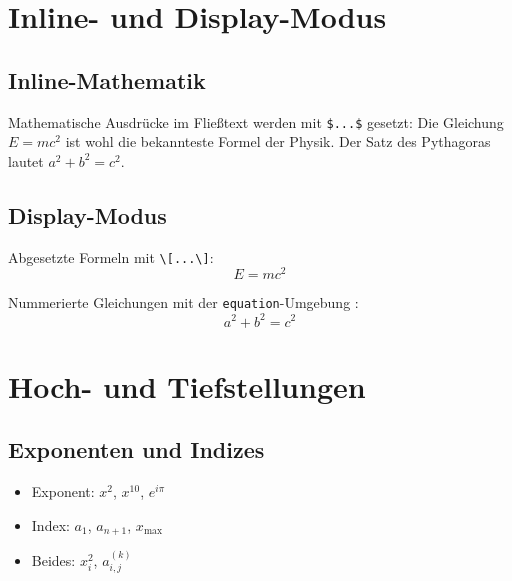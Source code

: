
\chapter{Inline- und Display-Modus}
\label{sec:modi}

\section{Inline-Mathematik}

Mathematische Ausdrücke im Fließtext werden mit \texttt{\$...\$} gesetzt:
Die Gleichung $E = mc^2$ ist wohl die bekannteste Formel der Physik.
Der Satz des Pythagoras lautet $a^2 + b^2 = c^2$.

\section{Display-Modus}

Abgesetzte Formeln mit \texttt{\textbackslash[...\textbackslash]}:
\[
    E = mc^2
\]

Nummerierte Gleichungen mit der \texttt{equation}-Umgebung \cite{mittelbach2004}:
\begin{equation}
    a^2 + b^2 = c^2
    \label{eq:pythagoras}
\end{equation}

\chapter{Hoch- und Tiefstellungen}
\label{sec:stellen}

\section{Exponenten und Indizes}

\begin{itemize}
    \item Exponent: $x^2$, $x^{10}$, $e^{i\pi}$
    \item Index: $a_1$, $a_{n+1}$, $x_{\max}$
    \item Beides: $x_i^2$, $a_{i,j}^{(k)}$
\end{itemize}

